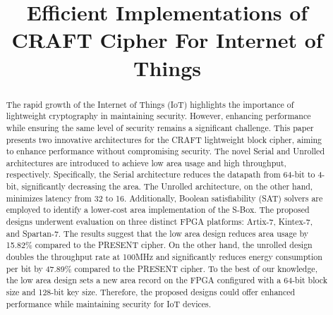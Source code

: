 \documentclass[final,5p,times,twocolumn]{elsarticle}
\begin{document}
\begin{frontmatter}

    \title{Efficient Implementations of CRAFT Cipher For Internet of Things }










    \begin{abstract}
        The rapid growth of the Internet of Things (IoT) highlights the importance of lightweight cryptography in maintaining security.
        However, enhancing performance while ensuring the same level of security remains a significant challenge.
        This paper presents two innovative architectures for the CRAFT lightweight block cipher, aiming to enhance performance without compromising security.
        The novel Serial and Unrolled architectures are introduced to achieve low area usage and high throughput, respectively.
        Specifically, the Serial architecture reduces the datapath from 64-bit to 4-bit, significantly decreasing the area.
        The Unrolled architecture, on the other hand, minimizes latency from 32 to 16.
        Additionally, Boolean satisfiability (SAT) solvers are employed to identify a lower-cost area implementation of the S-Box.
        The proposed designs underwent evaluation on three distinct FPGA platforms: Artix-7, Kintex-7, and Spartan-7.
        The results suggest that the low area design reduces area usage by 15.82\% compared to the PRESENT cipher.
        On the other hand, the unrolled design doubles the throughput rate at 100MHz and significantly reduces energy consumption per bit by 47.89\% compared to the PRESENT cipher.
        To the best of our knowledge, the low area design sets a new area record on the FPGA configured with a 64-bit block size and 128-bit key size.
        Therefore, the proposed designs could offer enhanced performance while maintaining security for IoT devices.
    \end{abstract}



\end{frontmatter}
\end{document}
